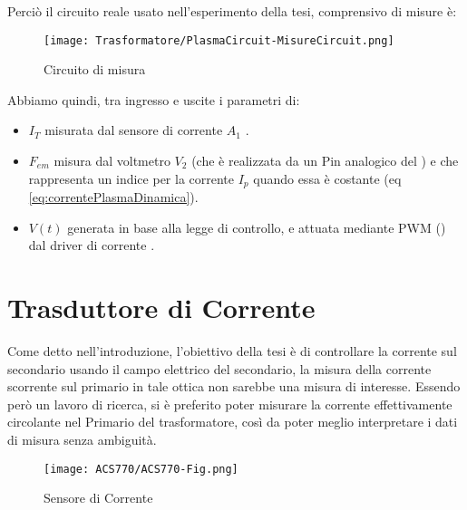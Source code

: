\newpage
Perciò il circuito reale usato nell'esperimento della tesi, comprensivo di misure è:\\
\begin{figure}[H] \label{fig:circuitoDiMisura}
	\centering
	\caption[Circuito reale di misura dell'esperimento]{Circuito di misura}
	\texttt{[image: Trasformatore/PlasmaCircuit-MisureCircuit.png]}
\end{figure}

Abbiamo quindi, tra ingresso e uscite i parametri di:
\begin{itemize}
	\item $I_T$ misurata dal sensore di corrente $ A_1 $ .
	\item $F_{em}$ misura dal voltmetro $V_2$ (che è realizzata da un Pin analogico del \microControllore) e che rappresenta un indice per  la corrente $I_p$ quando essa è costante (eq \ref{eq:correntePlasmaDinamica}).
	\item $V(t)$ generata in base alla legge di controllo, e attuata mediante PWM (\cite{modulazionePWM}) dal driver di corrente .
\end{itemize}


\newpage


\section{Trasduttore di Corrente}\label{CurrentSense}
Come detto nell'introduzione, l'obiettivo della tesi è di controllare la corrente sul secondario usando il campo elettrico del secondario, la misura della corrente scorrente sul primario in tale ottica non sarebbe una misura di interesse. Essendo però un lavoro di ricerca, si è preferito poter misurare la corrente effettivamente circolante nel Primario del trasformatore, così da poter meglio interpretare i dati di misura senza ambiguità.\\
\begin{figure}[H]
	\centering
	\caption[Sensore di Corrente ]{Sensore di Corrente}
	\texttt{[image: ACS770/ACS770-Fig.png]}
\end{figure}
